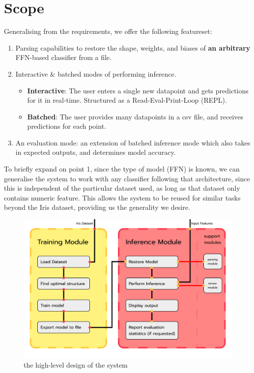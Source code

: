 \documentclass[12pt, titlepage]{article}
\begin{document}
\section{Scope}
Generalising from the requirements, we offer the following featureset:
\begin{enumerate}
	\item Parsing capabilities to restore the shape, weights, and biases of \textbf{an arbitrary} FFN-based classifier from a file.
	\item Interactive \& batched modes of performing inference. \begin{itemize}
		\item \textbf{Interactive}: The user enters a single new datapoint and gets predictions for it in real-time. Structured as a Read-Eval-Print-Loop (REPL).
		\item \textbf{Batched}: The user provides many datapoints in a csv file, and receives predictions for each point.
	\end{itemize}
	\item An evaluation mode: an extension of batched inference mode which also takes in expected outputs, and determines model accuracy.
\end{enumerate}
To briefly expand on point 1, since the type of model (FFN) is known, we can generalise the system to work with any classifier following that architecture, since this is independent of the particular dataset used, as long as that dataset only contains numeric feature. This allows the system to be reused for similar tasks beyond the Iris dataset, providing us the generality we desire.\bigskip

\begin{figure}
	\includegraphics[width=0.85\pdfpagewidth]{../images/modules.png}
	\caption{\label{fig:2}the high-level design of the system}
\end{figure}
\end{document}
